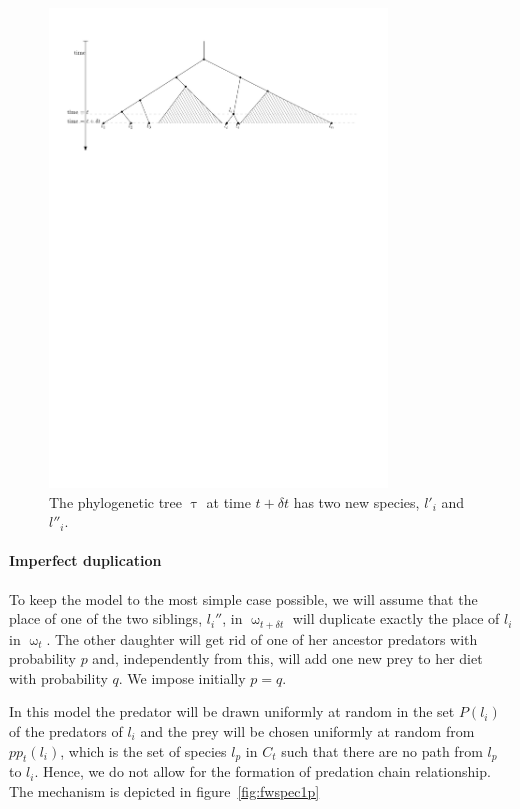 \documentclass[12pt,a4paper]{report}
\begin{document}
\begin{figure}[ht]
	\centering
		\includegraphics[width=0.8\textwidth]{images/phylogenydeltat}
		\caption{The phylogenetic tree $\uptau$ at time $t + \delta t$ has two new species, $l'_i$ and $l''_i$.}
		\label{fig:phylogenydeltat}
\end{figure}

\paragraph{Imperfect duplication}

To keep the model to the most simple case possible, we will assume that the place of one of the two siblings, $l_i''$, in $\upomega_{t + \delta t}$ will duplicate exactly the place of $l_i$ in $\upomega_t$. The other daughter will get rid of one of her ancestor predators with probability $p$ and, independently from this, will add one new prey to her diet with probability $q$. We impose initially $p = q$.

In this model the predator will be drawn uniformly at random in the set $P(l_i)$ of the predators of $l_i$ and the prey will be chosen uniformly at random from $pp_{t}(l_i)$, which is the set of species $l_p$ in $C_t$ such that there are no path from $l_p$ to $l_i$. Hence, we do not allow for the formation of predation chain relationship. The mechanism is depicted in figure~\ref{fig:fwspec1p}
\end{document}
